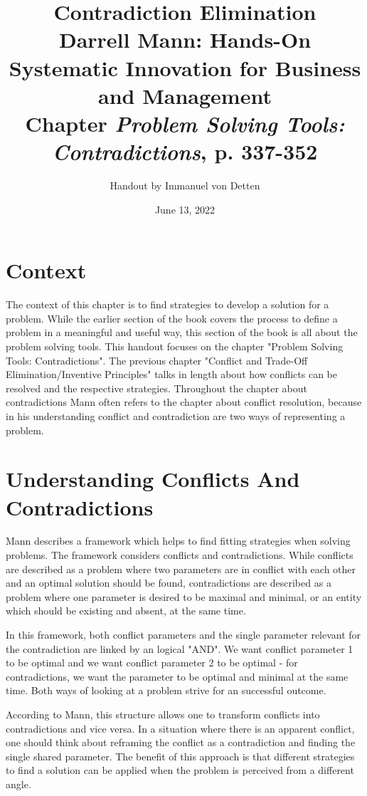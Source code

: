 \documentclass{article}
\title{Contradiction Elimination \\ \large Darrell Mann: Hands-On
Systematic
Innovation
for Business and Management \\ \large Chapter \textit{Problem Solving Tools: Contradictions}, p. 337-352}
\author{Handout by Immanuel von Detten}
\date{June 13, 2022}
\begin{document}
\maketitle

\section{Context}

The context of this chapter is to find strategies to develop a solution for a problem. While the earlier section of the book covers the process to define a problem in a meaningful and useful way, this section of the book is all about the problem solving tools. This handout focuses on the chapter "Problem Solving Tools: Contradictions". The previous chapter "Conflict and Trade-Off Elimination/Inventive Principles" talks in length about how conflicts can be resolved and the respective strategies. Throughout the chapter about contradictions Mann often refers to the chapter about conflict resolution, because in his understanding conflict and contradiction are two ways of representing a problem.

\section{Understanding Conflicts And Contradictions}

Mann describes a framework which helps to find fitting strategies when solving problems. The framework considers conflicts and contradictions. While conflicts are described as a problem where two parameters are in conflict with each other and an optimal solution should be found, contradictions are described as a problem where one parameter is desired to be maximal and minimal, or an entity which should be existing and absent, at the same time.

In this framework, both conflict parameters and the single parameter relevant for the contradiction are linked by an logical "AND". We want conflict parameter 1 to be optimal and we want conflict parameter 2 to be optimal - for contradictions, we want the parameter to be optimal and minimal at the same time. Both ways of looking at a problem strive for an successful outcome.

According to Mann, this structure allows one to transform conflicts into contradictions and vice versa. In a situation where there is an apparent conflict, one should think about reframing the conflict as a contradiction and finding the single shared parameter. The benefit of this approach is that different strategies to find a solution can be applied when the problem is perceived from a different angle.
\end{document}
